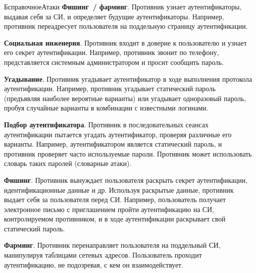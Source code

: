 \begin{appendix}{Б}{справочное}{Атаки}
{\bf Фишинг~/ фарминг}. 
Противник узнает аутентификаторы, выдавая себя за СИ, и определяет будущие 
аутентификаторы.
%
Например, противник переадресует пользователя на поддельную страницу 
аутентификации.


{\bf Социальная инженерия}. 
Противник входит в доверие к пользователю и узнает его секрет аутентификации.
%
Например, противник звонит по телефону, представляется системным администратором 
и просит сообщить пароль.


{\bf Угадывание}. 
Противник угадывает аутентификатор в ходе выполнения протокола аутентификации.
%
Например, противник угадывает статический пароль (предъявляя наиболее
вероятные варианты) или угадывает одноразовый пароль, пробуя случайные
варианты в комбинации с известными логинами.


\label{ATK.AP}

{\bf Подбор аутентификатора}. 
Противник в последовательных сеансах аутентификации пытается 
угадать аутентификатор, проверяя различные его варианты. 
Например, аутентификатором является статический пароль, 
и противник проверяет часто используемые пароли. 
Противник может использовать словарь таких паролей (словарные атаки).


{\bf Фишинг}. 
Противник вынуждает пользователя раскрыть секрет аутентификации, 
идентификационные данные и др. Используя раскрытые данные, противник 
выдает себя за пользователя перед СИ. Например, пользователь  
получает электронное письмо с приглашением пройти аутентификацию на 
СИ, контролируемом противником, и в ходе аутентификации раскрывает 
свой статический пароль. 

{\bf Фарминг}. 
Противник перенаправляет пользователя на поддельный СИ,
манипулируя таблицами сетевых адресов.
Пользователь проходит аутентификацию, не подозревая,
с кем он взаимодействует.


\end{appendix}

